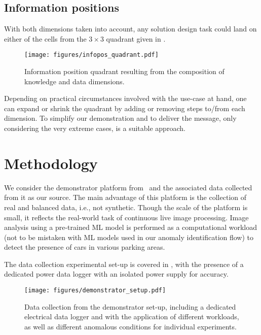 \subsection{Information positions}
With both dimensions taken into account, any solution design task could land on either of the cells from the $3 \times 3$ quadrant given in .
%
\begin{figure}[htbp]
	\centering
	\texttt{[image: figures/infopos\_quadrant.pdf]}
	\caption{Information position quadrant resulting from the composition of knowledge and data dimensions.}
	\label{fig:infopos_quadrant}
\end{figure}

Depending on practical circumstances involved with the use-case at hand, one can expand or shrink the quadrant by adding or removing steps to/from each dimension. To simplify our demonstration and to deliver the message, only considering the very extreme cases, is a suitable approach.

\section{Methodology}
\label{sec:methodology}
We consider the demonstrator platform from~\cite{Odyurt:2021:PPFT} and the associated data collected from it as our source. The main advantage of this platform is the collection of real and balanced data, i.e., not synthetic. Though the scale of the platform is small, it reflects the real-world task of continuous live image processing. Image analysis using a pre-trained ML model is performed as a computational workload (not to be mistaken with ML models used in our anomaly identification flow) to detect the presence of cars in various parking areas.

The data collection experimental set-up is covered in , with the presence of a dedicated power data logger with an isolated power supply for accuracy.
%
\begin{figure}[htbp]
	\centering
	\texttt{[image: figures/demonstrator\_setup.pdf]}
	\caption{Data collection from the demonstrator set-up, including a dedicated electrical data logger and with the application of different workloads, as well as different anomalous conditions for individual experiments.}
	\label{fig:demonstrator_setup}
\end{figure}

